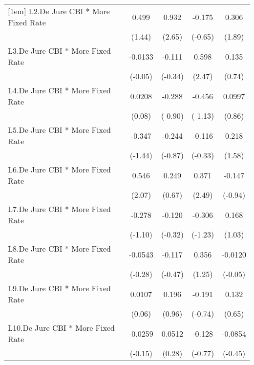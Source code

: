 {\begin{longtable}{l*{4}{c}}
[1em]
L2.De Jure CBI * More Fixed Rate&    0.499         &    0.932\sym{**} &   -0.175         &    0.306         \\
                &   (1.44)         &   (2.65)         &  (-0.65)         &   (1.89)         \\
[1em]
L3.De Jure CBI * More Fixed Rate&  -0.0133         &   -0.111         &    0.598\sym{*}  &    0.135         \\
                &  (-0.05)         &  (-0.34)         &   (2.47)         &   (0.74)         \\
[1em]
L4.De Jure CBI * More Fixed Rate&   0.0208         &   -0.288         &   -0.456         &   0.0997         \\
                &   (0.08)         &  (-0.90)         &  (-1.13)         &   (0.86)         \\
[1em]
L5.De Jure CBI * More Fixed Rate&   -0.347         &   -0.244         &   -0.116         &    0.218         \\
                &  (-1.44)         &  (-0.87)         &  (-0.33)         &   (1.58)         \\
[1em]
L6.De Jure CBI * More Fixed Rate&    0.546\sym{*}  &    0.249         &    0.371\sym{*}  &   -0.147         \\
                &   (2.07)         &   (0.67)         &   (2.49)         &  (-0.94)         \\
[1em]
L7.De Jure CBI * More Fixed Rate&   -0.278         &   -0.120         &   -0.306         &    0.168         \\
                &  (-1.10)         &  (-0.32)         &  (-1.23)         &   (1.03)         \\
[1em]
L8.De Jure CBI * More Fixed Rate&  -0.0543         &   -0.117         &    0.356         &  -0.0120         \\
                &  (-0.28)         &  (-0.47)         &   (1.25)         &  (-0.05)         \\
[1em]
L9.De Jure CBI * More Fixed Rate&   0.0107         &    0.196         &   -0.191         &    0.132         \\
                &   (0.06)         &   (0.96)         &  (-0.74)         &   (0.65)         \\
[1em]
L10.De Jure CBI * More Fixed Rate&  -0.0259         &   0.0512         &   -0.128         &  -0.0854         \\
                &  (-0.15)         &   (0.28)         &  (-0.77)         &  (-0.45)         \\

\end{longtable}}
